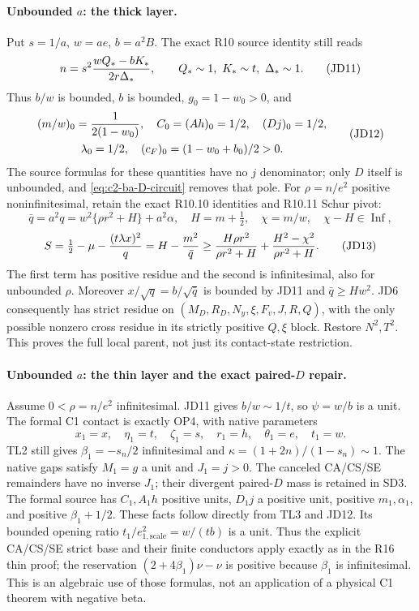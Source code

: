 \paragraph{Unbounded $a$: the thick layer.}
Put $s=1/a$, $w=ae$, $b=a^2B$.  The exact R10 source identity
still reads
\[
 n=s^2{wQ_*-bK_*\over2r\Delta_*},\qquad
 Q_*\sim1,\ K_*\sim t,\ \Delta_*\sim1.             \tag{JD11}
\]
Thus $b/w$ is bounded, $b$ is bounded, $g_0=1-w_0>0$, and
\[
\begin{gathered}
 (m/w)_0={1\over2(1-w_0)},\quad C_0=(Ah)_0=1/2,
 \quad (Dj)_0=1/2,\\ \lambda_0=1/2,
 \quad(c_F)_0=(1-w_0+b_0)/2>0.
\end{gathered}                       \tag{JD12}
\]
The source formulas for these quantities have no $j$ denominator;
only $D$ itself is unbounded, and \eqref{eq:c2-ba-D-circuit} removes that pole.
For $\rho=n/e^2$ positive noninfinitesimal, retain the exact R10.10
identities and R10.11 Schur pivot:
\[
 \bar q=a^2q=w^2\{\rho r^2+H\}+a^2\alpha,
 \quad H=m+\tfrac12,\quad \chi=m/w,
 \quad \chi-H\in\operatorname{Inf},
\]
\[
 S=\tfrac12-\mu-{(t\lambda x)^2\over q}
 =H-{m^2\over\bar q}
 \ge {H\rho r^2\over\rho r^2+H}
       +{H^2-\chi^2\over\rho r^2+H}.                 \tag{JD13}
\]
The first term has positive residue and the second is infinitesimal,
also for unbounded $\rho$.  Moreover $x/\sqrt q=b/\sqrt{\bar q}$
is bounded by JD11 and $\bar q\ge Hw^2$.  JD6 consequently has
strict residue on $(M_D,R_D,N_y,\xi,F_v,J,R,Q)$, with the only
possible nonzero cross residue in its strictly positive $Q,\xi$
block.  Restore $N^2,T^2$.  This proves the full local parent, not
just its contact-state restriction.

\paragraph{Unbounded $a$: the thin layer and the exact paired-$D$ repair.}
Assume $0<\rho=n/e^2$ infinitesimal.  JD11 gives
$b/w\sim1/t$, so $\psi=w/b$ is a unit.  The formal C1 contact is
exactly OP4, with native parameters
\[
 x_1=x,\quad\eta_1=t,\quad\zeta_1=s,\quad r_1=h,
 \quad\theta_1=e,\quad t_1=w.
\]
TL2 still gives $\beta_1=-s_n/2$ infinitesimal and
$\kappa=(1+2n)/(1-s_n)\sim1$.  The native gaps satisfy
$M_1=g$ a unit and $J_1=j>0$.  The canceled CA/CS/SE remainders
have no inverse $J_1$; their divergent paired-$D$ mass is retained
in SD3.  The formal source has $C_1,A_1h$ positive units,
$D_1j$ a positive unit, positive $m_1,\alpha_1$, and positive
$\beta_1+1/2$.  These facts follow directly from TL3 and JD12.
Its bounded opening ratio $t_1/e_{1,\mathrm{scale}}^2=w/(tb)$
is a unit.  Thus the explicit CA/CS/SE strict base and their finite
conductors apply exactly as in the R16 thin proof; the reservation
$(2+4\beta_1)\nu-\nu$ is positive because $\beta_1$ is
infinitesimal.  This is an algebraic use of those formulas, not an
application of a physical C1 theorem with negative beta.

